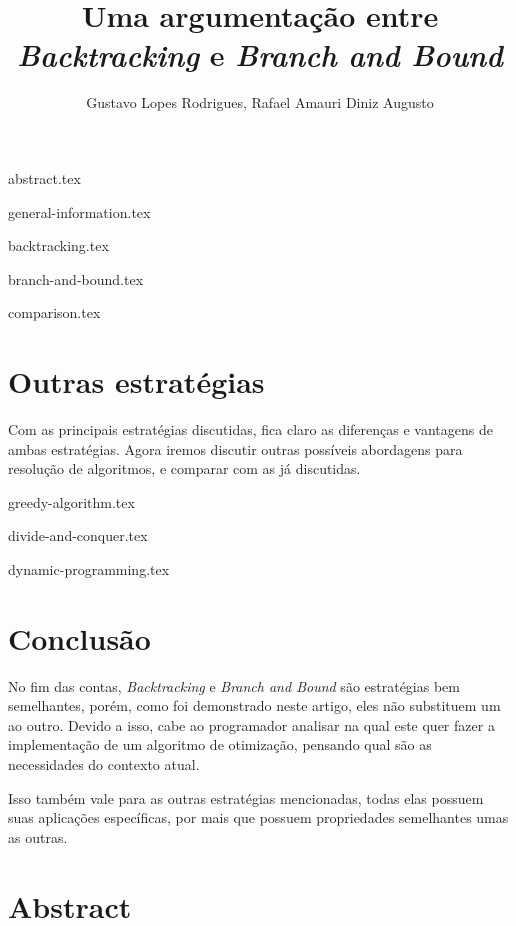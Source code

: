 \documentclass[12pt]{article}
\title{Uma argumentação entre \emph{Backtracking} e \emph{Branch and Bound}}
\author{Gustavo Lopes Rodrigues\inst{1}, Rafael Amauri Diniz Augusto\inst{2}}
\begin{document}
 

  \maketitle

  {abstract.tex}

  {general-information.tex}

  {backtracking.tex}

  {branch-and-bound.tex}

  {comparison.tex}

  \section{Outras estratégias} \label{sec:other-strategies}

    Com as principais estratégias discutidas, fica claro as diferenças 
    e vantagens de ambas estratégias. Agora iremos discutir outras possíveis
    abordagens para resolução de algoritmos, e comparar com as já discutidas.
    
    {greedy-algorithm.tex}

    {divide-and-conquer.tex}
  
    {dynamic-programming.tex}

  \section{Conclusão}

  No fim das contas, \emph{Backtracking} e \emph{Branch and Bound} são estratégias 
  bem semelhantes, porém, como foi demonstrado neste artigo, eles não substituem um ao 
  outro. Devido a isso, cabe ao programador analisar na qual este quer fazer a implementação 
  de um algoritmo de otimização, pensando qual são as necessidades do contexto atual.

  Isso também vale para as outras estratégias mencionadas, todas elas possuem suas aplicações 
  específicas, por mais que possuem propriedades semelhantes umas as outras.

  
  

  \newpage

  \section*{Abstract}
\end{document}
